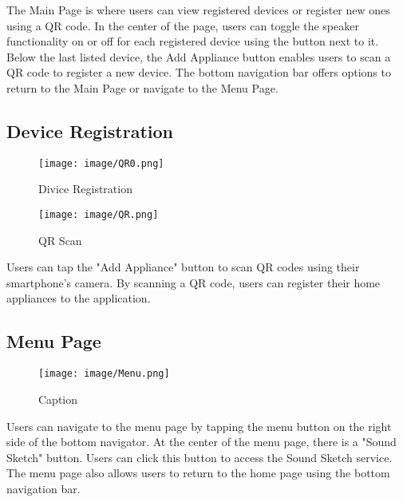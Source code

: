 \documentclass[conference]{IEEEtran}
\begin{document}
\noindent The Main Page is where users can view registered devices or register new ones using a QR code. In the center of the page, users can toggle the speaker functionality on or off for each registered device using the button next to it. Below the last listed device, the Add Appliance button enables users to scan a QR code to register a new device. The bottom navigation bar offers options to return to the Main Page or navigate to the Menu Page.\\

\clearpage

\subsection{Device Registration}

\begin{figure}[h!]
    \centering
    \texttt{[image: image/QR0.png]}
    \caption{Divice Registration}
    \label{fig:enter-label}
\end{figure}

\begin{figure}[h!]
    \centering
    \texttt{[image: image/QR.png]}
    \caption{QR Scan}
    \label{fig:enter-label}
\end{figure}
\noindent Users can tap the "Add Appliance" button to scan QR codes using their smartphone's camera. By scanning a QR code, users can register their home appliances to the application.\\

\vspace{3cm}

\subsection{Menu Page}
\begin{figure}
    \centering
    \texttt{[image: image/Menu.png]}
    \caption{Caption}
    \label{fig:enter-label}
\end{figure}

\noindent Users can navigate to the menu page by tapping the menu button on the right side of the bottom navigator. At the center of the menu page, there is a "Sound Sketch" button.
Users can click this button to access the Sound Sketch service. The menu page also allows users to return to the home page using the bottom navigation bar.\\

\clearpage
\end{document}
